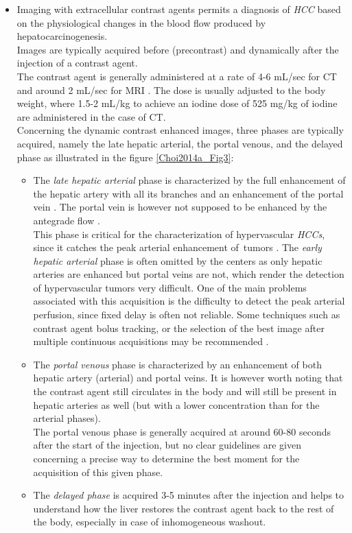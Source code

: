 \documentclass[]{article}
\begin{document}
\begin{itemize}
\item Imaging with extracellular contrast agents permits a diagnosis of
  \emph{HCC} based on the physiological changes in the blood flow
  produced by hepatocarcinogenesis.\\
  Images are typically acquired before (precontrast) and dynamically
  after the injection of a contrast agent.\\
  The contrast agent is generally administered at a rate of 4-6 mL/sec
  for CT and around 2 mL/sec for MRI \cite{Schima2005, Frydrychowicz2012}. The dose is usually adjusted to the body weight, where 1.5-2
  mL/kg to achieve an iodine dose of 525 mg/kg of iodine are
  administered in the case of CT.\\
  Concerning the dynamic contrast enhanced images, three phases are
  typically acquired, namely the late hepatic arterial, the portal
  venous, and the delayed phase as illustrated in the figure \ref{Choi2014a_Fig3}:
  \begin{itemize}
  \item The \emph{late hepatic arterial} phase is characterized by the full
    enhancement of the hepatic artery with all its branches and an
    enhancement of the portal vein \cite{Choi2014}.
    The portal vein is however not supposed to be enhanced by the
    antegrade flow \cite{Miraglia2007}.\\
    This phase is critical for the characterization of hypervascular
    \emph{HCCs}, since it catches the peak arterial enhancement
    of~tumors \cite{Kim2006}. The \emph{early
    hepatic arterial} phase is often omitted by the centers as only
    hepatic arteries are enhanced but portal veins are not, which render
    the detection of hypervascular tumors very difficult. One of the
    main problems associated with this acquisition is the difficulty to
    detect the peak arterial perfusion, since fixed delay is often not
    reliable. Some techniques such as contrast agent bolus tracking, or
    the selection of the best image after multiple continuous
    acquisitions may be recommended \cite{Earls1997}.
  \item The \emph{portal venous} phase is characterized by an enhancement of
    both hepatic artery (arterial) and portal veins. It is however worth
    noting that the contrast agent still circulates in the body and will
    still be present in hepatic arteries as well (but with a lower
    concentration than for the arterial phases).\\
    The portal venous phase is generally acquired at around 60-80
    seconds after the start of the injection, but no clear guidelines
    are given concerning a precise way to determine the best moment for
    the acquisition of this given phase.
  \item The \emph{delayed phase} is acquired 3-5 minutes after the injection
    and helps to understand how the liver restores the contrast agent
    back to the rest of the body, especially in case of inhomogeneous
    washout.
  \end{itemize}
\end{itemize}
\end{document}
